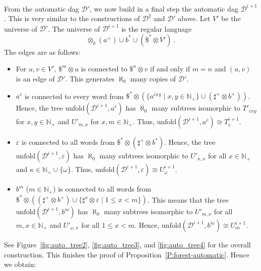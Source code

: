 \documentclass[envcountsame]{llncs}
\newcommand{\unfold}{\mathrm{unfold}}
\newcommand{\N}{\mathbb N}
\begin{document}
{}From the automatic dag $\mathcal D'$, we now build in a final step
the automatic dag $\mathcal D^{i+1}$. This is very similar to the
constructions of $\mathcal D^2$ and $\mathcal D'$ above.
Let $V'$ be the universe of $\mathcal D'$.
The universe of $\mathcal D^{i+1}$ is the regular language
$$
\otimes_k(a^+) \cup b^* \cup (\$^* \otimes V')\ .
$$
The edges are as follows:
\begin{itemize}
\item For $u,v \in V'$, $\$^m \otimes u$ is connected to $\$^n \otimes v$ 
 if and only if $m=n$ and $(u,v)$ is an edge of $\mathcal D'$.
 This generates $\aleph_0$ many copies of $\mathcal D'$.
\item $a^{\overline c}$ is connected to every word from 
 $\$^* \otimes (\{ a^{\overline c x y} \mid x,y \in \N_+ \} \cup (\sharp^+ \otimes b^+))$.
Hence, the tree $\unfold(\mathcal D^{i+1}, a^{\overline c})$ 
has $\aleph_0$ many subtrees isomorphic to $T'_{\overline cxy}$ for $x,y \in \N_+$ and $U'_{m,x}$
for $x,m \in \N_+$. Thus, $\unfold(\mathcal D^{i+1}, a^{\overline c}) \cong T^{i+1}_{\overline{c}}$.

\item $\varepsilon$ is connected to all words from 
$\$^* \otimes (\sharp^+ \otimes b^*)$. Hence, the tree $\unfold(\mathcal D^{i+1}, \varepsilon)$ has
$\aleph_0$ many subtrees isomorphic to 
$U'_{\kappa,x}$ for all $x \in \N_+$ and $\kappa \in \N_+ \cup \{\omega\}$. 
Thus, $\unfold(\mathcal D^{i+1}, \varepsilon) \cong U^{i+1}_{\omega}$.

\item $b^m$ ($m \in \N_+$) is connected to all words from $\$^* \otimes
  ((\sharp^+ \otimes b^+) \cup \{\sharp^x \otimes\varepsilon \mid 1 \leq x < m\})$. 
  This means that the tree $\unfold(\mathcal D^{i+1}, b^m)$ has 
  $\aleph_0$ many subtrees isomorphic to $U'_{m,x}$ for all
  $m,x \in \N_+$ and $U'_{\omega,x}$ for all $1 \leq x < m$. Hence, 
  $\unfold(\mathcal D^{i+1}, b^m) \cong U^{i+1}_m$.
\end{itemize}
See Figure~\ref{fig:auto_tree2}, \ref{fig:auto_tree3}, and
\ref{fig:auto_tree4} for the overall construction.
This finishes the proof of Proposition~\ref{P:forest-automatic}. Hence we
obtain:
\end{document}
